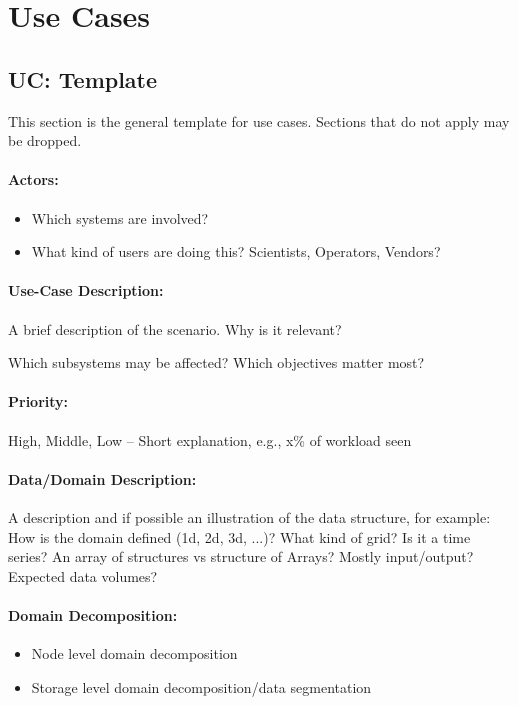 \section{Use Cases}

\subsection{UC: Template}

This section is the general template for use cases.
Sections that do not apply may be dropped.

\paragraph{Actors:}
\begin{itemize}
	\item Which systems are involved?
	\item What kind of users are doing this? Scientists, Operators, Vendors?
\end{itemize}

\paragraph{Use-Case Description:}
A brief description of the scenario.
Why is it relevant?

Which subsystems may be affected?
Which objectives matter most?

\paragraph{Priority:}
High, Middle, Low -- Short explanation, e.g., x\% of workload seen


\paragraph{Data/Domain Description:}
A description and if possible an illustration of the data structure, for example:
How is the domain defined (1d, 2d, 3d, ...)?
What kind of grid?
Is it a time series?
An array of structures vs structure of Arrays?
Mostly input/output?
Expected data volumes?

\paragraph{Domain Decomposition:}
\begin{itemize}
	\item Node level domain decomposition
	\item Storage level domain decomposition/data segmentation
\end{itemize}

